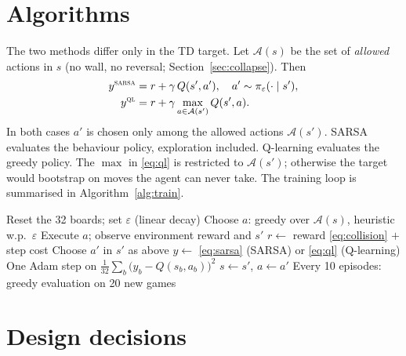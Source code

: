 \documentclass{article}
\begin{document}
\section{Algorithms}
\label{sec:algo}

The two methods differ only in the TD target.
Let $\mathcal{A}(s)$ be the set of \emph{allowed} actions in $s$ (no wall, no reversal; Section~\ref{sec:collapse}). Then
\begin{align}
y^{\textsc{sarsa}} &= r + \gamma\, Q(s',a'), \quad a' \sim \pi_\varepsilon(\cdot \mid s'), \label{eq:sarsa}\\
y^{\textsc{ql}} &= r + \gamma \max_{a \in \mathcal{A}(s')} Q(s',a). \label{eq:ql}
\end{align}
In both cases $a'$ is chosen only among the allowed actions $\mathcal{A}(s')$. SARSA evaluates the behaviour policy, exploration included. Q-learning evaluates the greedy policy.
The $\max$ in \eqref{eq:ql} is restricted to $\mathcal{A}(s')$; otherwise the target would bootstrap on moves the agent can never take.
The training loop is summarised in Algorithm~\ref{alg:train}.

\begin{algorithm}[tb]
   \caption{Training loop (shared by SARSA and Q-learning)}
   \label{alg:train}
\begin{algorithmic}
   \STATE Reset the 32 boards; set $\varepsilon$ (linear decay)
   \STATE Choose $a$: greedy over $\mathcal{A}(s)$, heuristic w.p.\ $\varepsilon$
   \STATE Execute $a$; observe environment reward and $s'$
   \STATE $r \leftarrow$ reward \eqref{eq:collision} $+$ step cost
   \STATE Choose $a'$ in $s'$ as above
   \STATE $y \leftarrow$ \eqref{eq:sarsa} (SARSA) or \eqref{eq:ql} (Q-learning)
   \STATE One Adam step on $\frac{1}{32}\sum_{b}\big(y_b - Q(s_b,a_b)\big)^2$
   \STATE $s \leftarrow s'$, $a \leftarrow a'$
   \ENDFOR
   \STATE Every 10 episodes: greedy evaluation on 20 new games
   \ENDFOR
\end{algorithmic}
\end{algorithm}

\section{Design decisions}
\label{sec:design}
\end{document}
